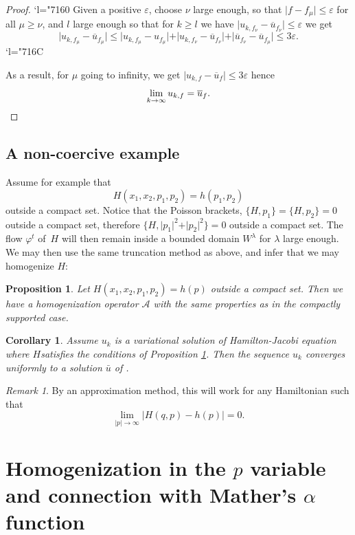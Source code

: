 \documentclass[JEP,XML,SOM,NoFloatCountersInSection,Unicode,published]{cedram}
\newcommand{\HJ}{\mathrm{HJ}}
\newcommand{\Changel}{\mathcode`l="7160}
\newcommand{\Changelback}{\mathcode`l="716C}
\numberwithin{equation}{section}
\theoremstyle{plain}
\newtheorem{proposition}[theorem]{Proposition}
\newtheorem{corollary}[theorem]{Corollary}
\theoremstyle{definition}
\theoremstyle{remark}
\newtheorem{remark}[theorem]{Remark}
\begin{document}
\begin{proof}
\Changel
Given a positive $ \varepsilon $, choose $\nu$ large enough, so that $ \vert f - f_{\mu} \vert \leq \varepsilon $ for all $\mu \geq \nu$,
and $l$ large enough so that for $k\geq l$
we have $ \vert u_{k,f_{\nu}}- \overline u_{f_{\nu}} \vert \leq \varepsilon$ we get
\[
\vert u_{k, f_{\mu}}- \overline u_{f_{\mu}} \vert \leq \vert u_{k, f_{\mu}}-u_{f_{\mu}} \vert + \vert u_{k,f_{\nu}}- \overline u_{f_{\nu}} \vert +
\vert \overline u_{f_{\nu}}- \overline u_{f_{\mu}} \vert \leq 3 \varepsilon.
\]
\Changelback\noindent

As a result, for $\mu$ going to infinity, we get $ \vert u_{k,f}- \overline u_{f} \vert \leq 3 \varepsilon $ hence
\[
\lim_{k\to \infty}u_{k,f}=\overline u_{f}.\qedhere
\]
\end{proof}

\subsection{A non-coercive example}
Assume for example that
\[
H(x_{1},x_{2},p_{1},p_{2}) = h(p_{1},p_{2})
\]
outside a compact set. Notice that the Poisson brackets, $\{H, p_{1}\}=\{H,p_{2}\}=0$ outside a compact set, therefore $ \{H, \vert p_{1} \vert ^2+ \vert p_{2} \vert ^2\}=0$ outside a compact set. The flow $\varphi^{t}$ of~$H$ will then remain inside a bounded domain $W^\lambda$ for $\lambda$ large enough. We may then use the same truncation method as above, and infer that we may homogenize $H$:

\begin{proposition}\label{Prop-12.15}
Let $H(x_{1},x_{2},p_{1},p_{2}) = h(p)$ outside a compact set. Then we have a homogenization operator $\mathcal A$ with the same properties as in the compactly supported case.
\end{proposition}

\begin{corollary} Assume $u_{k}$ is a variational solution of Hamilton-Jacobi equation \thetag{$\HJ_{k}$} where $H$satisfies the conditions of Proposition \ref{Prop-12.15}.
Then the sequence $u_{k}$ converges uniformly to a solution $\bar u$ of \thetag{$\overline{\HJ}$}.
\end{corollary}

\begin{remark} By an approximation method, this will work for any Hamiltonian such that
\[
\lim_{ \vert p \vert \to \infty } \vert H(q,p) - h(p) \vert =0.
\]
\end{remark}

\section{Homogenization in the \texorpdfstring{$p$}{p} variable and connection with Mather's \texorpdfstring{$\alpha$}{alpha} function }
\end{document}
